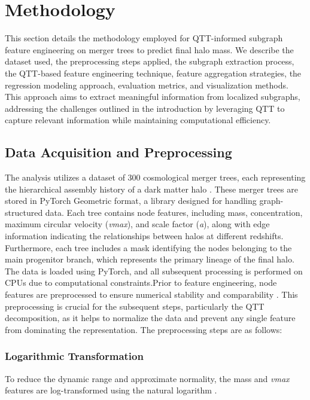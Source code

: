 \documentclass[twocolumn]{aastex631}
\begin{document}
\section{Methodology}This section details the methodology employed for QTT-informed subgraph feature engineering on merger trees to predict final halo mass. We describe the dataset used, the preprocessing steps applied, the subgraph extraction process, the QTT-based feature engineering technique, feature aggregation strategies, the regression modeling approach, evaluation metrics, and visualization methods. This approach aims to extract meaningful information from localized subgraphs, addressing the challenges outlined in the introduction by leveraging QTT to capture relevant information while maintaining computational efficiency.\subsection{Data Acquisition and Preprocessing}The analysis utilizes a dataset of 300 cosmological merger trees, each representing the hierarchical assembly history of a dark matter halo  \citep{parkinson2007generatingdarkmatterhalo,jiang2013generatingmergertreesdark,chandrogómez2025accuracydarkmatterhalo}. These merger trees are stored in PyTorch Geometric format, a library designed for handling graph-structured data. Each tree contains node features, including mass, concentration, maximum circular velocity (\textit{vmax}), and scale factor (\textit{a}), along with edge information indicating the relationships between halos at different redshifts. Furthermore, each tree includes a mask identifying the nodes belonging to the main progenitor branch, which represents the primary lineage of the final halo. The data is loaded using PyTorch, and all subsequent processing is performed on CPUs due to computational constraints.Prior to feature engineering, node features are preprocessed to ensure numerical stability and comparability  \citep{cao2025imagepreprocessingframeworktimedomain,nerval2025atacamacosmologytelescopedevelopment}. This preprocessing is crucial for the subsequent steps, particularly the QTT decomposition, as it helps to normalize the data and prevent any single feature from dominating the representation. The preprocessing steps are as follows:\subsubsection{Logarithmic Transformation}To reduce the dynamic range and approximate normality, the mass and \textit{vmax} features are log-transformed using the natural logarithm \citep{seo2011darkenergylogtransformedconvergence,greiner2014logtransformingmatterpowerspectrum,rubira2021effectivefieldtheoryperturbative}.\[
\]
\end{document}
